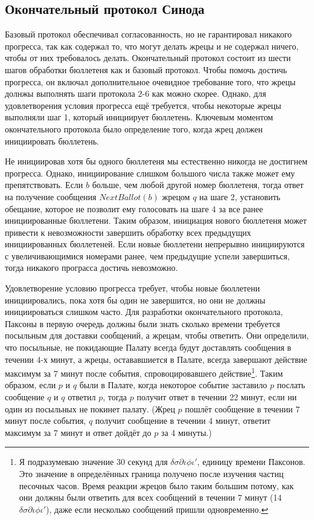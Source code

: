 \documentclass[12pt, a4paper]{article} %
\begin{document}
\subsection{Окончательный протокол Синода}

Базовый протокол обеспечивал согласованность, но не гарантировал никакого прогресса, так как содержал то, что могут делать жрецы и не содержал ничего, чтобы от них требовалось делать. Окончательный протокол состоит из шести шагов обработки бюллетеня как и базовый протокол. Чтобы помочь достичь прогресса, он включал дополнительное очевидное требование того, что жрецы долнжы выполнять шаги протокола 2-6 как можно скорее. Однако, для удовлетворения условия прогресса ещё требуется, чтобы некоторые жрецы выполняли шаг 1, который инициирует бюллетень. Ключевым  моментом окончательного протокола было определение того, когда жрец должен инициировать бюллетень.

Не инициировав хотя бы одного бюллетеня мы естественно никогда не достигнем прогресса. Однако, инициирование слишком большого числа также может ему препятствовать. Если $b$ больше, чем любой другой номер бюллетеня, тогда ответ на получение сообщения $NextBallot(b)$  жрецом $q$ на шаге 2, установить обещание, которое не позволит ему голосовать на шаге 4 за все ранее инициированные бюллетени. Таким образом, инициация нового бюллетеня может привести к невозможности завершить обработку всех предыдущих инициированных бюллетеней. Если новые бюллетени непрерывно инициируются с увеличивающимися номерами ранее, чем предыдущие успели завершиться, тогда никакого програсса достичь невозможно.

Удовлетворение условию прогресса требует, чтобы новые бюллетени инициировались, пока хотя бы один не завершится, но они не должны инициироваться слишком часто. Для разработки окончательного протокола, Паксоны в первую очередь должны были знать сколько времени требуется посыльным для доставки сообщений, а жрецам, чтобы ответить. Они определили, что посыльные, не покидающие Палату всегда будут доставлять сообщения в течении 4-х минут, а жрецы, остававшиется в Палате, всегда завершают действие максимум за 7 минут после события, спровоцировавшего действие\footnote{Я подразумеваю значение 30 секунд для $\delta\sigma\partial\iota\phi\iota'$, единицу времени Паксонов. Это значение в определённых граница получено после изучения частиц песочных часов. Время реакции жрецов было таким большим потому, как они должны были ответить для всех сообщений в течении 7 минут (14 $\delta\sigma\partial\iota\phi\iota'$), даже если несколько сообщений пришли одновременно.}. Таким образом, если $p$ и $q$ были в Палате, когда некоторое событие заставило $p$ послать сообщение $q$ и $q$ ответил $p$, тогда $p$ получит ответ в течении 22 минут, если ни один из посыльных не покинет палату. (Жрец $p$ пошлёт сообщение в течении 7 минут после события, $q$ получит сообщение в течении 4 минут, ответит максимум за 7 минут и ответ дойдёт до $p$ за 4 минуты.)
\end{document}
